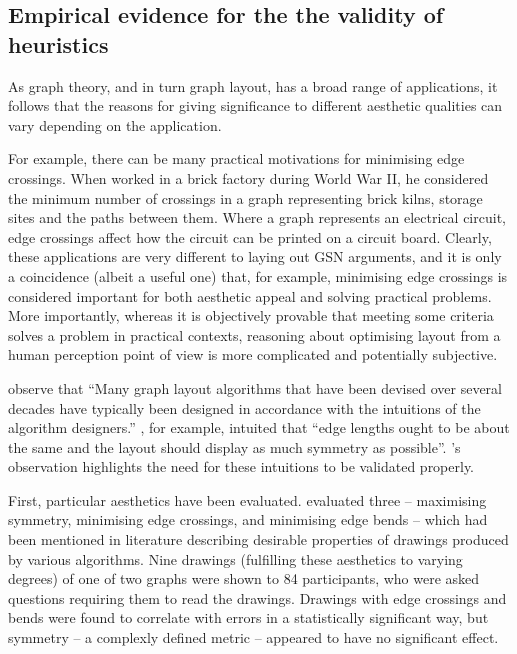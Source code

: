 \subsection{Empirical evidence for the the validity of heuristics \label{sec:emprirical}}

As graph theory, and in turn graph layout, has a broad range of applications, it follows that the reasons for giving significance to different aesthetic qualities can vary depending on the application.

For example, there can be many practical motivations for minimising edge crossings.
When \citet{JGT:JGT3190010105} worked in a brick factory during World War II,
he considered the minimum number of crossings in a graph representing
brick kilns, storage sites and the paths between them.
Where a graph represents an electrical circuit, edge crossings affect how the circuit can be printed on a circuit board.
Clearly, these applications are very different to laying out GSN arguments, and it is only a coincidence (albeit a useful one) that, for example, minimising edge crossings is considered important for both aesthetic appeal and solving practical problems.
More importantly, whereas it is objectively provable that meeting some criteria solves a problem in practical contexts, reasoning about optimising layout from a human perception point of view is more complicated and potentially subjective.

\citet{5674033} observe that ``Many graph layout algorithms that have been devised over
several decades have typically been designed in accordance with the intuitions of the algorithm designers.''
\citet{eades84}, for example, intuited that ``edge lengths ought to be about the same and the layout should display as much symmetry as possible''.
\citeauthor{5674033}'s observation highlights the need for these intuitions to be validated properly.

First, particular aesthetics have been evaluated. \citet{Purchase1997basis} evaluated three -- maximising symmetry, minimising edge crossings, and minimising edge bends -- which had been mentioned in literature describing desirable properties of drawings produced by various algorithms.
Nine drawings (fulfilling these aesthetics to varying degrees) of one of two graphs were shown to 84 participants,
who were asked questions requiring them to read the drawings.
Drawings with edge crossings and bends were found to correlate with errors in a statistically significant way, but symmetry -- a complexly defined metric -- appeared to have no significant effect.

